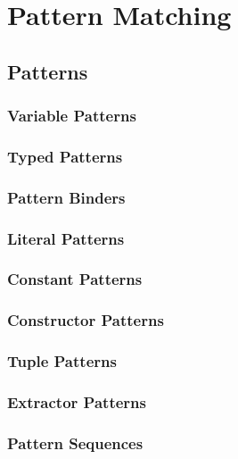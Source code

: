 
\chapter{Pattern Matching}

\section{Patterns}
\label{sec:patterns}

\subsection{Variable Patterns}

\subsection{Typed Patterns}

\subsection{Pattern Binders}

\subsection{Literal Patterns}

\subsection{Constant Patterns}
\label{sec:constant-patterns}

\subsection{Constructor Patterns}
\label{sec:constructor-patterns}

\subsection{Tuple Patterns}

\subsection{Extractor Patterns}
\label{sec:extractor-patterns}

\subsection{Pattern Sequences}

